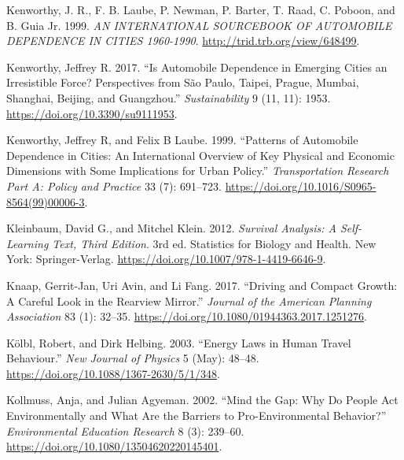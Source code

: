 \documentclass[
  12pt,
]{article}
\newlength{\cslhangindent}
\newlength{\cslentryspacingunit} %
\newenvironment{CSLReferences}[2] %
 {%
  \setlength{\parindent}{0pt}
  \ifodd #1
  \let\oldpar\par
  \def\par{\hangindent=\cslhangindent\oldpar}
  \fi
  \setlength{\parskip}{#2\cslentryspacingunit}
 }%
 {}
\begin{document}
\begin{CSLReferences}{1}{0}
\leavevmode{}%
Kenworthy, J. R., F. B. Laube, P. Newman, P. Barter, T. Raad, C. Poboon, and B. Guia Jr. 1999. \emph{{AN INTERNATIONAL SOURCEBOOK OF AUTOMOBILE DEPENDENCE IN CITIES} 1960-1990}. \url{http://trid.trb.org/view/648499}.

\leavevmode{}%
Kenworthy, Jeffrey R. 2017. {``Is {Automobile Dependence} in {Emerging Cities} an {Irresistible Force}? {Perspectives} from {São Paulo}, {Taipei}, {Prague}, {Mumbai}, {Shanghai}, {Beijing}, and {Guangzhou}.''} \emph{Sustainability} 9 (11, 11): 1953. \url{https://doi.org/10.3390/su9111953}.

\leavevmode{}%
Kenworthy, Jeffrey R, and Felix B Laube. 1999. {``Patterns of Automobile Dependence in Cities: An International Overview of Key Physical and Economic Dimensions with Some Implications for Urban Policy.''} \emph{Transportation Research Part A: Policy and Practice} 33 (7): 691--723. \url{https://doi.org/10.1016/S0965-8564(99)00006-3}.

\leavevmode{}%
Kleinbaum, David G., and Mitchel Klein. 2012. \emph{Survival {Analysis}: {A Self-Learning Text}, {Third Edition}}. 3rd ed. Statistics for {Biology} and {Health}. {New York}: {Springer-Verlag}. \url{https://doi.org/10.1007/978-1-4419-6646-9}.

\leavevmode{}%
Knaap, Gerrit-Jan, Uri Avin, and Li Fang. 2017. {``Driving and {Compact Growth}: {A Careful Look} in the {Rearview Mirror}.''} \emph{Journal of the American Planning Association} 83 (1): 32--35. \url{https://doi.org/10.1080/01944363.2017.1251276}.

\leavevmode{}%
Kölbl, Robert, and Dirk Helbing. 2003. {``Energy Laws in Human Travel Behaviour.''} \emph{New Journal of Physics} 5 (May): 48--48. \url{https://doi.org/10.1088/1367-2630/5/1/348}.

\leavevmode{}%
Kollmuss, Anja, and Julian Agyeman. 2002. {``Mind the {Gap}: {Why} Do People Act Environmentally and What Are the Barriers to Pro-Environmental Behavior?''} \emph{Environmental Education Research} 8 (3): 239--60. \url{https://doi.org/10.1080/13504620220145401}.


\end{CSLReferences}
\end{document}
